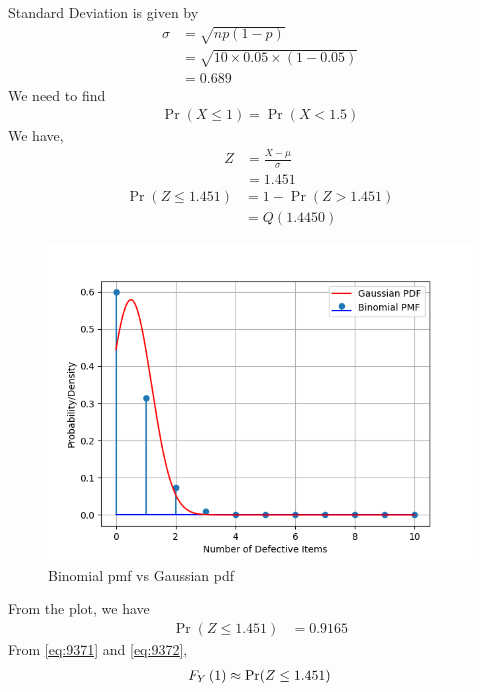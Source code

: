 \documentclass[]{article}
\begin{document}
Standard Deviation is given by
\begin{align}
	\sigma &= \sqrt{np(1 - p)}\\
	&= \sqrt{10 \times 0.05 \times (1 - 0.05)} \\
	&= 0.689
\end{align}
We need to find
\begin{align}
	\Pr(X \leq 1) = \Pr(X < 1.5)
\end{align}
We have,
\begin{align}
	Z &= \frac{X - \mu}{\sigma} \\
	&= 1.451
\end{align}
\begin{align}
	\Pr(Z \leq 1.451) &= 1 - \Pr(Z > 1.451)\\
	&= Q(1.4450)
\end{align}
\begin{figure}[!ht]
\includegraphics[width=\columnwidth]{./figs/fig.png}
\caption{Binomial pmf vs Gaussian pdf}
\label{fig:gaussian/9/3/7/}
\end{figure}
From the plot, we have
\begin{align}
	\Pr(Z \leq 1.451) &= 0.9165
	\label{eq:9372}
\end{align}
From \eqref{eq:9371} and \eqref{eq:9372},
\begin{align}
F_Y\left(1\right)\approx \Pr(Z \leq 1.451)
\end{align}
\end{document}
